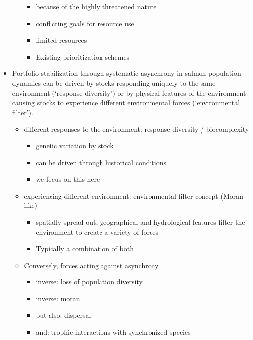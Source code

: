\begin{itemize}
\begin{itemize}
    \begin{itemize}
    \itemsep1pt\parskip0pt
    \item
      because of the highly threatened nature
    \item
      conflicting goals for resource use
    \item
      limited resources
    \item
      Existing prioritization schemes
    \end{itemize}
  \end{itemize}
\item
  Portfolio stabilization through systematic asynchrony in salmon population dynamics can be driven by stocks responding uniquely to the same environment (`response diversity') or by physical features of the environment causing stocks to experience different environmental forces (`environmental filter').

  \begin{itemize}
  \itemsep1pt\parskip0pt
  \item
    different responses to the environment: response diversity / biocomplexity

    \begin{itemize}
    \itemsep1pt\parskip0pt
    \item
      genetic variation by stock
    \item
      can be driven through historical conditions
    \item
      we focus on this here
    \end{itemize}
  \item
    experiencing different environment: environmental filter concept (Moran like)

    \begin{itemize}
    \itemsep1pt\parskip0pt
    \item
      spatially spread out, geographical and hydrological features filter the environment to create a variety of forces
    \item
      Typically a combination of both
    \end{itemize}
  \item
    Conversely, forces acting against asynchrony

    \begin{itemize}
    \itemsep1pt\parskip0pt
    \item
      inverse: loss of population diversity
    \item
      inverse: moran
    \item
      but also: dispersal
    \item
      and: trophic interactions with synchronized species
    \end{itemize}
  \end{itemize}
\end{itemize}

